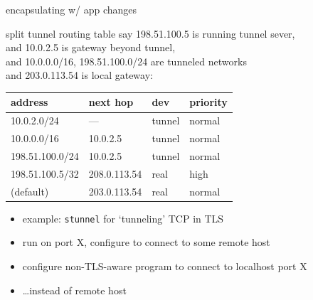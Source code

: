 \begin{frame}[label=encapChanges]{encapsulating w/ app changes}
\begin{frame}[fragile]{split tunnel routing table}
say 198.51.100.5 is running tunnel sever, \\
and 10.0.2.5  is gateway beyond tunnel, \\
and 10.0.0.0/16, 198.51.100.0/24 are tunneled networks \\
and 203.0.113.54 is local gateway: \\
\begin{tabular}{l|l|l|l}
address & next hop & dev & priority\\ \hline
10.0.2.0/24 & --- & tunnel & normal \\
10.0.0.0/16 & 10.0.2.5& tunnel & normal \\
198.51.100.0/24 & 10.0.2.5& tunnel & normal \\
198.51.100.5/32 & 208.0.113.54 & real & high\\
(default) & 203.0.113.54 & real & normal \\
\end{tabular}
\end{frame}




\begin{frame}
    \begin{itemize}
    \item example: \texttt{stunnel} for `tunneling' TCP in TLS
    \item run on port X, configure to connect to some remote host
    \item configure non-TLS-aware program to connect to localhost port X
    \item \ldots instead of remote host
    \end{itemize}
\end{frame}


\end{frame}
